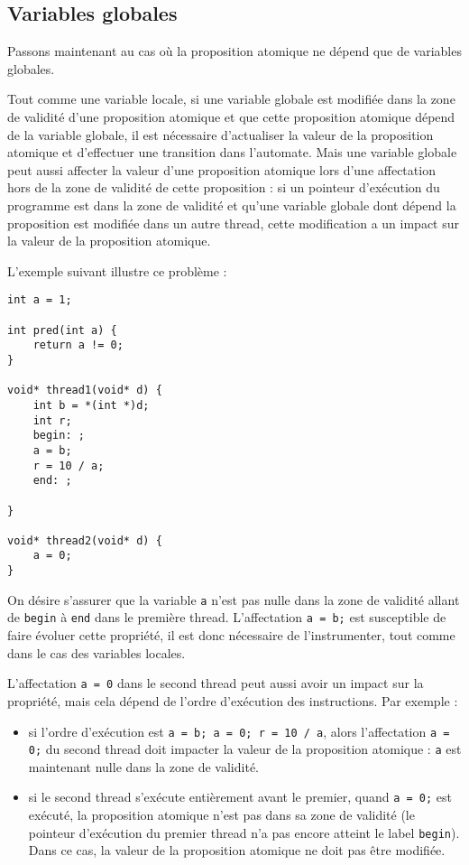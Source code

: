 \subsection{Variables globales}

Passons maintenant au cas où la proposition atomique ne dépend que de
variables globales.

Tout comme une variable locale, si une variable globale est modifiée
dans la zone de validité d'une proposition atomique et que cette
proposition atomique dépend de la variable globale, il est nécessaire
d'actualiser la valeur de la proposition atomique et d'effectuer une
transition dans l'automate. Mais une variable globale peut aussi
affecter la valeur d'une proposition atomique lors d'une affectation
hors de la zone de validité de cette proposition : si un pointeur
d'exécution du programme est dans la zone de validité et qu'une variable
globale dont dépend la proposition est modifiée dans un autre thread,
cette modification a un impact sur la valeur de la proposition atomique.

L'exemple suivant illustre ce problème :

\begin{lstlisting}
int a = 1;

int pred(int a) {
    return a != 0;
}

void* thread1(void* d) {
    int b = *(int *)d;
    int r;
    begin: ;
    a = b;
    r = 10 / a;
    end: ;

}

void* thread2(void* d) {
    a = 0;
}
\end{lstlisting}

On désire s'assurer que la variable \texttt{a} n'est pas nulle dans
la zone de validité allant de \texttt{begin} à \texttt{end} dans
le première thread. L'affectation \texttt{a = b;} est susceptible de
faire évoluer cette propriété, il est donc nécessaire de l'instrumenter,
tout comme dans le cas des variables locales.

L'affectation \texttt{a = 0} dans le second thread peut aussi avoir
un impact sur la propriété, mais cela dépend de l'ordre d'exécution des
instructions. Par exemple :

\begin{itemize}
\item
  si l'ordre d'exécution est \texttt{a = b; a = 0; r = 10 / a}, alors
  l'affectation \texttt{a = 0;} du second thread doit impacter la
  valeur de la proposition atomique : \texttt{a} est maintenant nulle
  dans la zone de validité.
\item
  si le second thread s'exécute entièrement avant le premier, quand
  \texttt{a = 0;} est exécuté, la proposition atomique n'est pas dans
  sa zone de validité (le pointeur d'exécution du premier thread n'a pas
  encore atteint le label \texttt{begin}). Dans ce cas, la valeur de
  la proposition atomique ne doit pas être modifiée.
\end{itemize}

